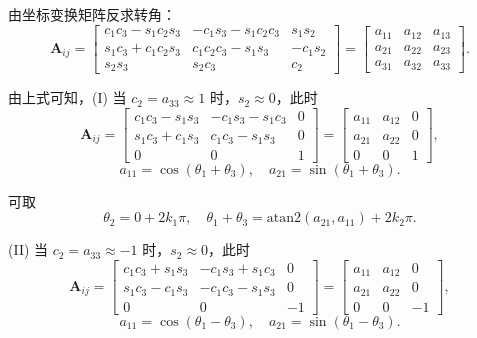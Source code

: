 由坐标变换矩阵反求转角：
\begin{equation}
    \bm{A}_{ij} = \begin{bmatrix}
        c_1c_3 - s_1c_2s_3 & -c_1s_3 - s_1c_2c_3 & s_1s_2\\
        s_1c_3 + c_1c_2s_3 & c_1c_2c_3 - s_1s_3 & -c_1s_2\\
        s_2s_3 & s_2c_3 & c_2
    \end{bmatrix}
    = \begin{bmatrix}
        a_{11} & a_{12} & a_{13}\\
        a_{21} & a_{22} & a_{23}\\
        a_{31} & a_{32} & a_{33}
    \end{bmatrix}.
\end{equation}

由上式可知，(I) 当 $c_2 = a_{33} \approx 1$ 时，$s_2 \approx 0$，此时
\begin{equation}
    \bm{A}_{ij} = \begin{bmatrix}
        c_1c_3 - s_1s_3 & -c_1s_3 - s_1c_3 & 0\\
        s_1c_3 + c_1s_3 & c_1c_3 - s_1s_3 & 0\\
        0 & 0 & 1
    \end{bmatrix}
    = \begin{bmatrix}
        a_{11} & a_{12} & 0\\
        a_{21} & a_{22} & 0\\
        0 & 0 & 1
    \end{bmatrix},
\end{equation}
\begin{equation}
    a_{11} = \cos(\theta_1 + \theta_3),\quad a_{21} = \sin(\theta_1 + \theta_3).
\end{equation}

可取
\begin{equation}
    \theta_2 = 0 + 2k_1\pi,\quad \theta_1 + \theta_3 = \mathrm{atan2}(a_{21}, a_{11}) + 2k_2\pi.
\end{equation}

(II) 当 $c_2 = a_{33} \approx -1$ 时，$s_2 \approx 0$，此时
\begin{equation}
    \bm{A}_{ij} = \begin{bmatrix}
        c_1c_3 + s_1s_3 & -c_1s_3 + s_1c_3 & 0\\
        s_1c_3 - c_1s_3 & -c_1c_3 - s_1s_3 & 0\\
        0 & 0 & -1
    \end{bmatrix}
    = \begin{bmatrix}
        a_{11} & a_{12} & 0\\
        a_{21} & a_{22} & 0\\
        0 & 0 & -1
    \end{bmatrix},
\end{equation}
\begin{equation}
    a_{11} = \cos(\theta_1 - \theta_3),\quad a_{21} = \sin(\theta_1 - \theta_3).
\end{equation}

